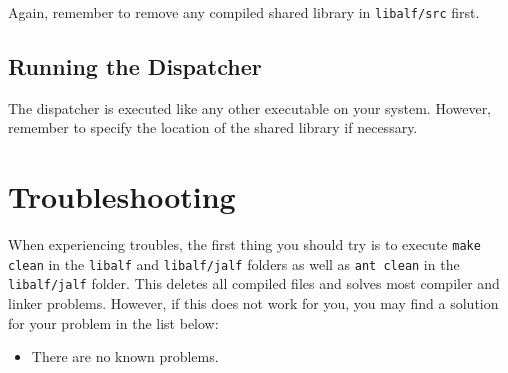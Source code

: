 
Again, remember to remove any compiled shared library in \texttt{libalf/src} first.

\subsection{Running the Dispatcher}
The dispatcher is executed like any other executable on your system. However, remember to specify the location of the \libalf shared library if necessary.


\section{Troubleshooting}


When experiencing troubles, the first thing you should try is to execute \texttt{make clean} in the \texttt{libalf} and \texttt{libalf/jalf} folders as well as \texttt{ant clean} in the \texttt{libalf/jalf} folder. This deletes all compiled files and solves most compiler and linker problems. However, if this does not work for you, you may find a solution for your problem in the list below:

\begin{itemize}
  \item There are no known problems.
\end{itemize}
